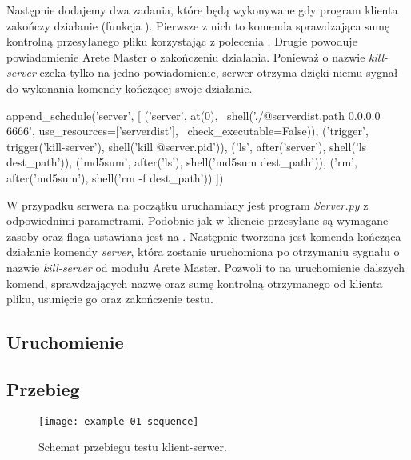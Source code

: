 \documentclass[00-praca-magisterska.tex]{subfiles}
\begin{document}
Następnie dodajemy dwa zadania, które będą wykonywane gdy program klienta zakończy
działanie (funkcja ). Pierwsze z nich to komenda sprawdzająca sumę
kontrolną przesyłanego pliku korzystając z polecenia . Drugie
powoduje powiadomienie Arete Master o zakończeniu działania. Ponieważ
 o nazwie \emph{kill-server} czeka tylko na jedno powiadomienie,
serwer otrzyma dzięki niemu sygnał do wykonania komendy kończącej swoje
działanie.

\begin{pythoncode}
  append_schedule('server', [
      ('server', at(0), \
          shell('./@{serverdist.path} 0.0.0.0 6666', use_resources=['serverdist'], \
	  check_executable=False)),
      ('trigger', trigger('kill-server'), shell('kill @{server.pid}')),
      ('ls', after('server'), shell('ls dest_path')),
      ('md5sum', after('ls'), shell('md5sum dest_path')),
      ('rm', after('md5sum'), shell('rm -f dest_path'))
  ])
\end{pythoncode}

W przypadku serwera na początku uruchamiany jest program \emph{Server.py} z
odpowiednimi parametrami. Podobnie jak w kliencie przesyłane są wymagane zasoby
oraz flaga \code{check\_executable} ustawiana jest na \code{False}. Następnie
tworzona jest komenda kończąca działanie komendy \emph{server}, która zostanie
uruchomiona po otrzymaniu sygnału o nazwie \emph{kill-server} od modułu Arete
Master. Pozwoli to na uruchomienie dalszych komend, sprawdzających nazwę oraz
sumę kontrolną otrzymanego od klienta pliku, usunięcie go oraz zakończenie
testu.

\subsection{Uruchomienie}


\subsection{Przebieg}

\begin{figure}[htb]
\begin{center}
\leavevmode
\texttt{[image: example-01-sequence]}
\end{center}
\caption{Schemat przebiegu testu klient-serwer.}
\label{fig:example-01-sequence}
\end{figure}
\end{document}
